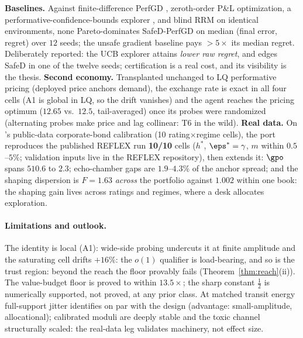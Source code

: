 \documentclass{article}
\begin{document}
\textbf{Baselines.} Against finite-difference PerfGD \citep{izzo2021learn}, zeroth-order P\&L optimization, a performative-confidence-bounds explorer \citep{jagadeesan2022regret}, and blind RRM on identical environments, none Pareto-dominates SafeD-PerfGD on median (final error, regret) over $12$ seeds; the unsafe gradient baseline pays $>5\times$ its median regret. Deliberately reported: the UCB explorer attains \emph{lower raw regret}, and edges SafeD in one of the twelve seeds; certification is a real cost, and its visibility is the thesis. \textbf{Second economy.} Transplanted unchanged to LQ performative pricing (deployed price anchors demand), the exchange rate is exact in all four cells (A1 is global in LQ, so the drift vanishes) and the agent reaches the pricing optimum ($12.65$ vs.\ $12.5$, tail-averaged) once its probes were randomized (alternating probes make price and lag collinear: T6 in the wild). \textbf{Real data.} On \citet{reflex2026}'s public-data corporate-bond calibration (10 rating$\times$regime cells), the port reproduces the published REFLEX run \textbf{10/10} cells ($h^*$, $\eps^* = \gamma$, $m$ within $0.5$--$5\%$; validation inputs live in the REFLEX repository), then extends it: $\gpo$ spans $510.6$ to $2.3$; echo-chamber gaps are $1.9$--$4.3\%$ of the anchor spread; and the shaping dispersion is $F = 1.63$ \emph{across} the portfolio against $1.002$ within one book: the shaping gain lives across ratings and regimes, where a desk allocates exploration.

\paragraph{Limitations and outlook.}\label{sec:limits} The identity is local (A1): wide-side probing undercuts it at finite amplitude and the saturating cell drifts $+16\%$: the $o(1)$ qualifier is load-bearing, and so is the trust region: beyond the reach the floor provably fails (Theorem~\ref{thm:reach}(ii)). The value-budget floor is proved to within $13.5\times$; the sharp constant $\tfrac12$ is numerically supported, not proved, at any prior class. At matched transit energy full-support jitter identifies on par with the design (advantage: small-amplitude, allocational); calibrated moduli are deeply stable and the toxic channel structurally scaled: the real-data leg validates machinery, not effect size.




\clearpage
\appendix
\end{document}
